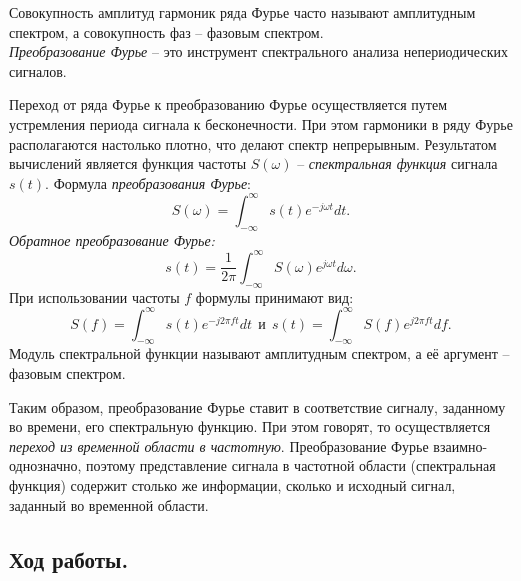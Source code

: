 \documentclass[a4paper,14pt]{extarticle}
\begin{document}
Совокупность амплитуд гармоник ряда Фурье часто называют амплитудным спектром, а совокупность фаз – фазовым спектром. \\

\textit{Преобразование Фурье} -- это инструмент спектрального анализа непериодических сигналов. 

Переход от ряда Фурье к преобразованию Фурье осуществляется путем устремления периода сигнала к бесконечности. При этом гармоники в ряду Фурье располагаются настолько плотно, что делают спектр непрерывным. Результатом вычислений является функция частоты $S(\omega)$ -- \textit{спектральная функция} сигнала $s(t)$. Формула \textit{преобразования Фурье}:
\begin{equation*}
S(\omega) = \int_{-\infty}^{\infty} s(t)e^{-j\omega t} dt.
\end{equation*}
\textit{Обратное преобразование Фурье:}
\begin{equation*}
s(t) = \frac{1}{2\pi} \int_{-\infty}^{\infty} S(\omega)e^{j\omega t} d\omega.
\end{equation*}
При использовании частоты $f$ формулы принимают вид:
\begin{equation*}
S(f) = \int_{-\infty}^{\infty} s(t)e^{-j2\pi ft} dt ~~\text{и} ~~ s(t) = \int_{-\infty}^\infty S(f) e^{j2\pi ft} df.
\end{equation*}
Модуль спектральной функции называют амплитудным спектром, а её аргумент -- фазовым спектром.

Таким образом, преобразование Фурье ставит в соответствие сигналу,
заданному во времени, его спектральную функцию. При этом говорят, то осуществляется \textit{переход из временной области в частотную}. Преобразование Фурье взаимно-однозначно, поэтому представление сигнала в частотной области (спектральная функция) содержит столько же информации, сколько и исходный сигнал, заданный во временной области.

\subsection{Ход работы.}
\end{document}
